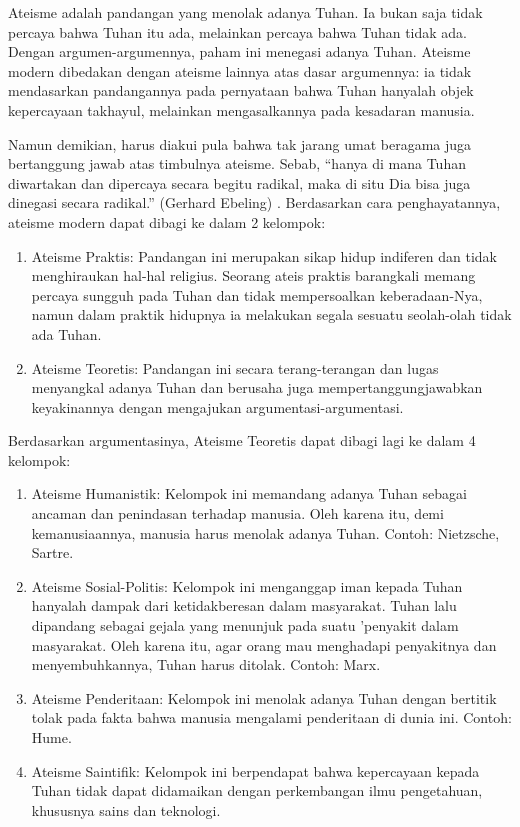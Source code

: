 \documentclass[11pt,twoside,a5paper,openany]{memoir}
\def\tightlist{}
\begin{document}
Ateisme adalah pandangan yang menolak adanya Tuhan. Ia bukan saja tidak
percaya bahwa Tuhan itu ada, melainkan percaya bahwa Tuhan tidak ada.
Dengan argumen-argumennya, paham ini menegasi adanya Tuhan. Ateisme
modern dibedakan dengan ateisme lainnya atas dasar argumennya: ia tidak
mendasarkan pandangannya pada pernyataan bahwa Tuhan hanyalah objek
kepercayaan takhayul, melainkan mengasalkannya pada kesadaran manusia.

Namun demikian, harus diakui pula bahwa tak jarang umat beragama juga
bertanggung jawab atas timbulnya ateisme. Sebab, ``hanya di mana Tuhan
diwartakan dan dipercaya secara begitu radikal, maka di situ Dia bisa
juga dinegasi secara radikal.'' (Gerhard Ebeling) . Berdasarkan cara
penghayatannya, ateisme modern dapat dibagi ke dalam 2 kelompok:

\begin{enumerate}
\def\labelenumi{\arabic{enumi}.}
\tightlist
\item
  Ateisme Praktis: Pandangan ini merupakan sikap hidup indiferen dan
  tidak menghiraukan hal-hal religius. Seorang ateis praktis barangkali
  memang percaya sungguh pada Tuhan dan tidak mempersoalkan
  keberadaan-Nya, namun dalam praktik hidupnya ia melakukan segala
  sesuatu seolah-olah tidak ada Tuhan.
\item
  Ateisme Teoretis: Pandangan ini secara terang-terangan dan lugas
  menyangkal adanya Tuhan dan berusaha juga mempertanggungjawabkan
  keyakinannya dengan mengajukan argumentasi-argumentasi.
\end{enumerate}

Berdasarkan argumentasinya, Ateisme Teoretis dapat dibagi lagi ke dalam
4 kelompok:

\begin{enumerate}
\def\labelenumi{\arabic{enumi}.}
\tightlist
\item
  Ateisme Humanistik: Kelompok ini memandang adanya Tuhan sebagai
  ancaman dan penindasan terhadap manusia. Oleh karena itu, demi
  kemanusiaannya, manusia harus menolak adanya Tuhan. Contoh: Nietzsche,
  Sartre.
\item
  Ateisme Sosial-Politis: Kelompok ini menganggap iman kepada Tuhan
  hanyalah dampak dari ketidakberesan dalam masyarakat. Tuhan lalu
  dipandang sebagai gejala yang menunjuk pada suatu 'penyakit dalam
  masyarakat. Oleh karena itu, agar orang mau menghadapi penyakitnya dan
  menyembuhkannya, Tuhan harus ditolak. Contoh: Marx.
\item
  Ateisme Penderitaan: Kelompok ini menolak adanya Tuhan dengan bertitik
  tolak pada fakta bahwa manusia mengalami penderitaan di dunia ini.
  Contoh: Hume.
\item
  Ateisme Saintifik: Kelompok ini berpendapat bahwa kepercayaan kepada
  Tuhan tidak dapat didamaikan dengan perkembangan ilmu pengetahuan,
  khususnya sains dan teknologi.
\end{enumerate}
\end{document}
